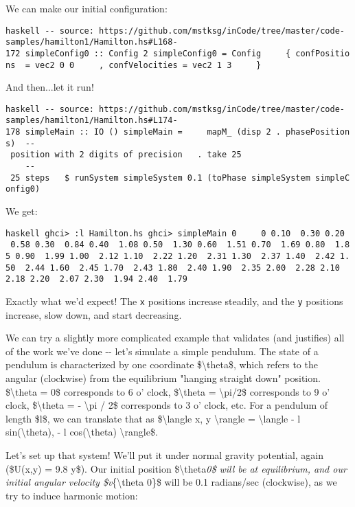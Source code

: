 \documentclass[]{article}
\begin{document}
We can make our initial configuration:

\texttt{haskell\ -\/-\ source:\ https://github.com/mstksg/inCode/tree/master/code-samples/hamilton1/Hamilton.hs\#L168-172\ simpleConfig0\ ::\ Config\ 2\ simpleConfig0\ =\ Config\ \ \ \ \ \{\ confPositions\ \ =\ vec2\ 0\ 0\ \ \ \ \ ,\ confVelocities\ =\ vec2\ 1\ 3\ \ \ \ \ \}}

And then...let it run!

\texttt{haskell\ -\/-\ source:\ https://github.com/mstksg/inCode/tree/master/code-samples/hamilton1/Hamilton.hs\#L174-178\ simpleMain\ ::\ IO\ ()\ simpleMain\ =\ \ \ \ \ mapM\_\ (disp\ 2\ .\ phasePositions)\ \ -\/-\ position\ with\ 2\ digits\ of\ precision\ \ \ .\ take\ 25\ \ \ \ \ \ \ \ \ \ \ \ \ \ \ \ \ \ \ \ \ \ \ \ \ \ -\/-\ 25\ steps\ \ \ \$\ runSystem\ simpleSystem\ 0.1\ (toPhase\ simpleSystem\ simpleConfig0)}

We get:

\texttt{haskell\ ghci\textgreater{}\ :l\ Hamilton.hs\ ghci\textgreater{}\ simpleMain\ 0\ \ \ \ \ 0\ 0.10\ \ 0.30\ 0.20\ \ 0.58\ 0.30\ \ 0.84\ 0.40\ \ 1.08\ 0.50\ \ 1.30\ 0.60\ \ 1.51\ 0.70\ \ 1.69\ 0.80\ \ 1.85\ 0.90\ \ 1.99\ 1.00\ \ 2.12\ 1.10\ \ 2.22\ 1.20\ \ 2.31\ 1.30\ \ 2.37\ 1.40\ \ 2.42\ 1.50\ \ 2.44\ 1.60\ \ 2.45\ 1.70\ \ 2.43\ 1.80\ \ 2.40\ 1.90\ \ 2.35\ 2.00\ \ 2.28\ 2.10\ \ 2.18\ 2.20\ \ 2.07\ 2.30\ \ 1.94\ 2.40\ \ 1.79}

Exactly what we'd expect! The \texttt{x} positions increase steadily, and the
\texttt{y} positions increase, slow down, and start decreasing.

We can try a slightly more complicated example that validates (and justifies)
all of the work we've done -\/- let's simulate a simple pendulum. The state of a
pendulum is characterized by one coordinate \$\textbackslash{}theta\$, which
refers to the angular (clockwise) from the equilibrium "hanging straight down"
position. \$\textbackslash{}theta = 0\$ corresponds to 6 o' clock,
\$\textbackslash{}theta = \textbackslash{}pi/2\$ corresponds to 9 o' clock,
\$\textbackslash{}theta = - \textbackslash{}pi / 2\$ corresponds to 3 o' clock,
etc. For a pendulum of length \$l\$, we can translate that as
\$\textbackslash{}langle x, y \textbackslash{}rangle = \textbackslash{}langle -
l sin(\textbackslash{}theta), - l cos(\textbackslash{}theta)
\textbackslash{}rangle\$.

Let's set up that system! We'll put it under normal gravity potential, again
(\$U(x,y) = 9.8 y\$). Our initial position \$\textbackslash{}theta\emph{0\$ will
be at equilibrium, and our initial angular velocity \$v}\{\textbackslash{}theta
0\}\$ will be 0.1 radians/sec (clockwise), as we try to induce harmonic motion:
\end{document}
